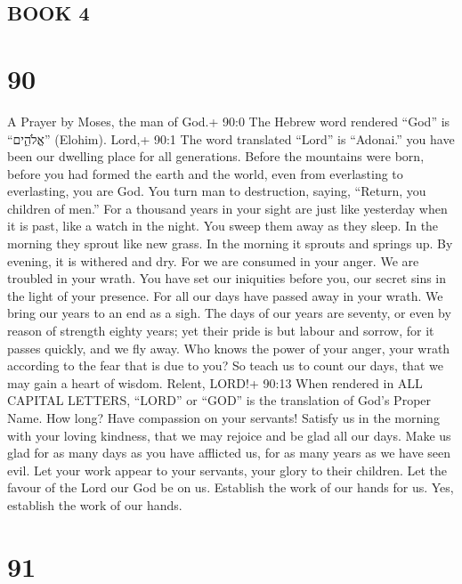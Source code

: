 \hypertarget{book-4}{%
\subsection{BOOK 4}\label{book-4}}

\hypertarget{section-80}{%
\section{90}\label{section-80}}

A Prayer by Moses, the man of God.+ 90:0 The Hebrew word rendered
``God'' is ``אֱלֹהִ֑ים'' (Elohim).  Lord,+ 90:1 The word
translated ``Lord'' is ``Adonai.'' you have been our dwelling place for
all generations.  Before the mountains were born, before you
had formed the earth and the world, even from everlasting to
everlasting, you are God.  You turn man to destruction,
saying, ``Return, you children of men.''  For a thousand
years in your sight are just like yesterday when it is past, like a
watch in the night.  You sweep them away as they sleep. In
the morning they sprout like new grass.  In the morning it
sprouts and springs up. By evening, it is withered and dry. 
For we are consumed in your anger. We are troubled in your wrath.
 You have set our iniquities before you, our secret sins in
the light of your presence.  For all our days have passed
away in your wrath. We bring our years to an end as a sigh.
 The days of our years are seventy, or even by reason of
strength eighty years; yet their pride is but labour and sorrow, for it
passes quickly, and we fly away.  Who knows the power of
your anger, your wrath according to the fear that is due to you?
 So teach us to count our days, that we may gain a heart of
wisdom.  Relent, LORD!+ 90:13 When rendered in ALL CAPITAL
LETTERS, ``LORD'' or ``GOD'' is the translation of God's Proper Name.
How long? Have compassion on your servants!  Satisfy us in
the morning with your loving kindness, that we may rejoice and be glad
all our days.  Make us glad for as many days as you have
afflicted us, for as many years as we have seen evil.  Let
your work appear to your servants, your glory to their children.
 Let the favour of the Lord our God be on us. Establish the
work of our hands for us. Yes, establish the work of our hands.

\hypertarget{section-81}{%
\section{91}\label{section-81}}

